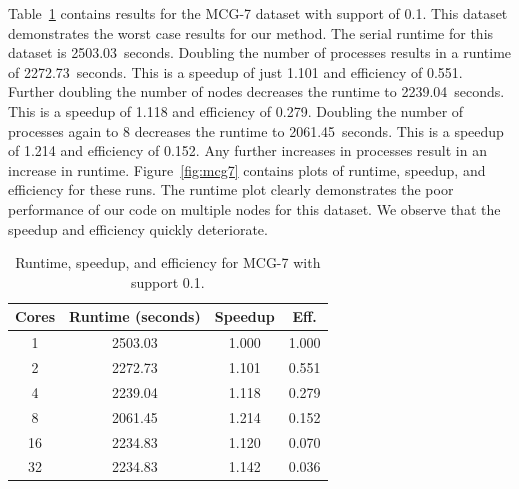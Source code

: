 Table~\ref{tab:mcg7} contains results for the MCG-7 dataset with
support of 0.1. This dataset demonstrates the worst case results for our
method. The serial runtime for this dataset is 2503.03~seconds.
Doubling the number of processes results in a runtime of 2272.73~seconds. This
is a speedup of just 1.101 and efficiency of 0.551. Further doubling the number
of nodes decreases the runtime to 2239.04~seconds. This is a speedup of 1.118
and efficiency of 0.279. Doubling the number of processes again to 8 decreases
the runtime to 2061.45~seconds. This is a speedup of 1.214 and efficiency of
0.152. Any further increases in processes result in an increase in runtime.
Figure~\ref{fig:mcg7} contains plots of runtime, speedup, and efficiency
for these runs. The runtime plot clearly demonstrates the poor performance of
our code on multiple nodes for this dataset. We observe that the speedup and
efficiency quickly deteriorate.


\begin{table}
\centering
\begin{tabular}{cccc}
\hline
Cores & Runtime (seconds) & Speedup &  Eff.  \\
\hline
 1    & 2503.03 & 1.000  & 1.000 \\
 2    & 2272.73 & 1.101  & 0.551 \\
 4    & 2239.04 & 1.118  & 0.279 \\
 8    & 2061.45 & 1.214  & 0.152 \\
16    & 2234.83 & 1.120  & 0.070 \\
32    & 2234.83 & 1.142  & 0.036 \\
\hline
\end{tabular}
\caption{Runtime, speedup, and efficiency for MCG-7 with support
         0.1.}
\label{tab:mcg7}
\end{table}

